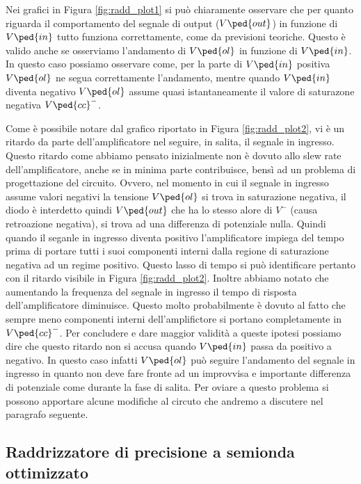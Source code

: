Nei grafici in Figura \ref{fig:radd_plot1} si può chiaramente osservare che per quanto riguarda il comportamento del segnale di output ($V\ped{out}$) in funzione di $V\ped{in}$ tutto funziona correttamente, come da previsioni teoriche. Questo è valido anche se osserviamo l'andamento di $V\ped{ol}$ in funzione di $V\ped{in}$. In questo caso possiamo osservare come, per la parte di $V\ped{in}$ positiva $V\ped{ol}$ ne segua correttamente l'andamento, mentre quando $V\ped{in}$ diventa negativo $V\ped{ol}$ assume quasi istantaneamente il valore di saturazone negativa $V\ped{cc}^-$.

Come è possibile notare dal grafico riportato in Figura \ref{fig:radd_plot2}, vi è un ritardo da parte dell'amplificatore nel seguire, in salita, il segnale in ingresso. Questo ritardo come abbiamo pensato inizialmente non è dovuto allo slew rate dell'amplificatore, anche se in minima parte contribuisce, bensì ad un problema di progettazione del circuito.
Ovvero, nel momento in cui il segnale in ingresso assume valori negativi la tensione $V\ped{ol}$ si trova in saturazione negativa, il diodo è interdetto quindi $V\ped{out}$ che ha lo stesso alore di $V^-$ (causa retroazione negativa), si trova ad una differenza di potenziale nulla. Quindi quando il seganle in ingresso diventa positivo l'amplificatore impiega del tempo prima di portare tutti i suoi componenti interni dalla regione di saturazione negativa ad un regime positivo. Questo lasso di tempo si può identificare pertanto con il ritardo visibile in Figura \ref{fig:radd_plot2}. Inoltre abbiamo notato che aumentando la frequenza del segnale in ingresso il tempo di risposta dell'amplificatore diminuisce. Questo molto probabilmente è dovuto al fatto che sempre meno componenti interni dell'amplifictore si portano completamente in $V\ped{cc}^-$.
Per concludere e dare maggior validità a queste ipotesi possiamo dire che questo ritardo non si accusa quando $V\ped{in}$ passa da positivo a negativo. In questo caso infatti $V\ped{ol}$ può seguire l'andamento del segnale in ingresso in quanto non deve fare fronte ad un improvvisa e importante differenza di potenziale come durante la fase di salita. 
Per oviare a questo problema si possono apportare alcune modifiche al circuto che andremo a discutere nel paragrafo seguente.

\subsection*{Raddrizzatore di precisione a semionda ottimizzato}

